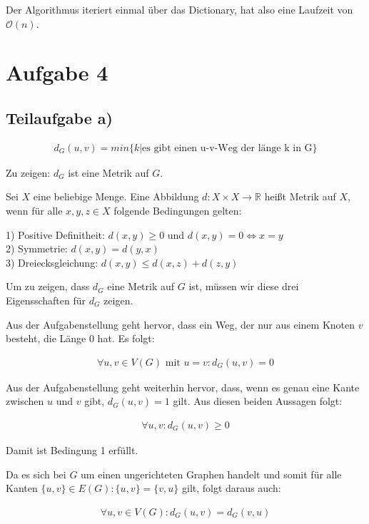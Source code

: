 \documentclass[12pt]{scrartcl}%
\theoremstyle{nonumberplain}
\newcommand{\R}{\mathbb{R}}
\newcommand{\bO}[1]{\mathcal O(#1)}
\begin{document}
Der Algorithmus iteriert einmal über das Dictionary, hat also eine Laufzeit von $\bO{n}$.

\newpage

\section*{Aufgabe 4}

\subsection*{Teilaufgabe a)}

\begin{align*}
	d_G(u,v) = min\{k | \text{es gibt einen u-v-Weg der länge k in G}\}
\end{align*}

Zu zeigen: $d_G$ ist eine Metrik auf $G$.

Sei $X$ eine beliebige Menge. Eine Abbildung $d: X \times X \rightarrow \R$ heißt Metrik auf $X$, wenn für alle $x,y,z \in X$ folgende Bedingungen gelten:

1) Positive Definitheit: $d(x,y) \ge 0$ und $d(x,y) = 0 \Leftrightarrow x = y $ \\
2) Symmetrie: $d(x,y) = d(y,x)$ \\
3) Dreiecksgleichung: $d(x,y) \le d(x,z) + d(z,y)$

Um zu zeigen, dass $d_G$ eine Metrik auf $G$ ist, müssen wir diese drei Eigensschaften für $d_G$ zeigen.

Aus der Aufgabenstellung geht hervor, dass ein Weg, der nur aus einem Knoten $v$ besteht, die Länge $0$ hat. Es folgt:

\begin{align*}
	\forall u,v \in V(G)\text{ mit } u=v: d_G(u,v) = 0
\end{align*}

Aus der Aufgabenstellung geht weiterhin hervor, dass, wenn es genau eine Kante zwischen $u$ und $v$ gibt, $d_G(u,v) = 1$ gilt.  Aus diesen beiden Aussagen folgt:

\begin{align*}
	\forall u,v: d_G(u,v) \ge 0
\end{align*}

Damit ist Bedingung 1 erfüllt.

Da es sich bei $G$ um einen ungerichteten Graphen handelt und somit für alle Kanten $\{u,v\} \in E(G): \{u,v\} = \{v,u\}$ gilt, folgt daraus auch:

\begin{align*}
	\forall u,v \in V(G): d_G(u,v) = d_G(v,u)
\end{align*}
\end{document}
